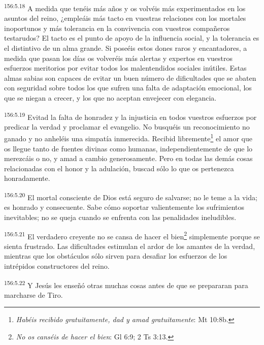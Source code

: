 \par
\textsuperscript{156:5.18} A medida que tenéis más años y os volvéis más experimentados en los asuntos del reino, ¿empleáis más tacto en vuestras relaciones con los mortales inoportunos y más tolerancia en la convivencia con vuestros compañeros testarudos? El tacto es el punto de apoyo de la influencia social, y la tolerancia es el distintivo de un alma grande. Si poseéis estos dones raros y encantadores, a medida que pasan los días os volveréis más alertas y expertos en vuestros esfuerzos meritorios por evitar todos los malentendidos sociales inútiles. Estas almas sabias son capaces de evitar un buen número de dificultades que se abaten con seguridad sobre todos los que sufren una falta de adaptación emocional, los que se niegan a crecer, y los que no aceptan envejecer con elegancia.

\par
\textsuperscript{156:5.19} Evitad la falta de honradez y la injusticia en todos vuestros esfuerzos por predicar la verdad y proclamar el evangelio. No busquéis un reconocimiento no ganado y no anheléis una simpatía inmerecida. Recibid libremente\footnote{\textit{Habéis recibido gratuitamente, dad y amad gratuitamente}: Mt 10:8b.} el amor que os llegue tanto de fuentes divinas como humanas, independientemente de que lo merezcáis o no, y amad a cambio generosamente. Pero en todas las demás cosas relacionadas con el honor y la adulación, buscad sólo lo que os pertenezca honradamente.

\par
\textsuperscript{156:5.20} El mortal consciente de Dios está seguro de salvarse; no le teme a la vida; es honrado y consecuente. Sabe cómo soportar valientemente los sufrimientos inevitables; no se queja cuando se enfrenta con las penalidades ineludibles.

\par
\textsuperscript{156:5.21} El verdadero creyente no se cansa de hacer el bien\footnote{\textit{No os canséis de hacer el bien}: Gl 6:9; 2 Ts 3:13.} simplemente porque se sienta frustrado. Las dificultades estimulan el ardor de los amantes de la verdad, mientras que los obstáculos sólo sirven para desafiar los esfuerzos de los intrépidos constructores del reino.

\par
\textsuperscript{156:5.22} Y Jesús les enseñó otras muchas cosas antes de que se prepararan para marcharse de Tiro.

